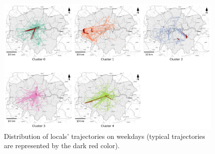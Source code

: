 \documentclass{article}
\theoremstyle{remark}
\begin{document}
\begin{figure}[!h]
\centering
\includegraphics[width=1\textwidth]{figures/traj_distribution_weekday_locals.png}
\caption{\label{fig:traj_distribution_weekday_locals}Distribution of locals' trajectories on weekdays (typical trajectories are represented by the dark red color).}
\end{figure}
\end{document}
